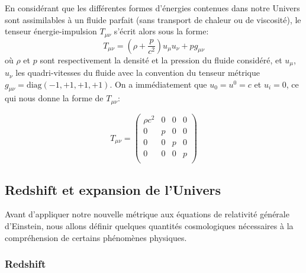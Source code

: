 \documentclass[../main/main.tex]{subfiles}
\begin{document}
En considérant que les différentes formes d'énergies contenues dans
notre Univers sont assimilables à un
fluide parfait (sans transport de chaleur ou de viscosité), le tenseur
énergie-impulsion $T_{\mu\nu}$ s'écrit alors sous la forme:
\begin{equation}
  \label{eq:Tmunu}
  T_{\mu\nu} = \left( \rho + \frac{p}{c^{2}}\right)u_{\mu}u_{\nu}+pg_{\mu\nu}
\end{equation}
où $\rho$ et $p$ sont respectivement la densité et la pression du fluide
considéré, et $u_{\mu}$, $u_{\nu}$ les quadri-vitesses du fluide avec la
convention du tenseur métrique $g_{\mu\nu}=\text{diag}(-1,+1,+1,+1)$.
On a immédiatement que $u_{0}=u^{0}=c$ et $u_{i}=0$, ce qui nous donne
la forme de $T_{\mu\nu}$:

\begin{equation}
  \label{eq:Tmunusimple}
  T_{\mu\nu}=
  \begin{pmatrix}
    \rho c^{2}&0&0&0\\
    0&p&0&0\\ 
    0&0&p&0\\ 
    0&0&0&p\\ 
\end{pmatrix} 
\end{equation}

\subsection{Redshift et expansion de l'Univers}

Avant d'appliquer notre nouvelle métrique aux équations de relativité
générale d'Einstein, nous allons définir quelques quantités
cosmologiques nécessaires à la compréhension de certains phénomènes
physiques. 

\subsubsection{Redshift}
\end{document}
